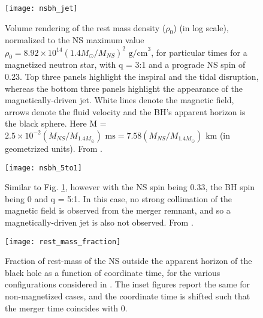     \begin{figure}[H]
        \centering
        \texttt{[image: nsbh\_jet]}
        \caption[Tidal disruption of a NS in a 3:1 NSBH binary]{
                    Volume rendering of the rest mass density ($\rho_0$) (in log scale),
                    normalized to the NS maximum value $\rho_0 = 8.92 \times 10^{14}
                    (1.4 M_{\odot}/M_{NS})^2 \text{ g/cm}^3$, for particular times for a
                    magnetized neutron star, with q = 3:1 and a prograde NS spin of
                    0.23.  Top three panels highlight the inspiral and the tidal
                    disruption, whereas the bottom three panels highlight the appearance
                    of the magnetically-driven jet. White lines denote the magnetic
                    field, arrows denote the fluid velocity and the BH's apparent
                    horizon is the black sphere. Here M = $2.5 \times 10^{-2}
                    (M_{NS}/M_{1.4M_{\odot}}) \text{ ms} = 7.58
                    (M_{NS}/M_{1.4M_{\odot}}) \text{ km}$ (in geometrized units). From
                    \cite{ruiz_2020}.
             }
        \label{fig:nsbh_jet}
    \end{figure}

    \begin{figure}[H]
        \centering
        \texttt{[image: nsbh\_5to1]}
        \caption[Tidal disruption of a NS in a 5:1 NSBH binary]{
                    Similar to Fig. \ref{fig:nsbh_jet}, however with the NS spin being
                    0.33, the BH spin being 0 and q = 5:1. In this case, no strong
                    collimation of the magnetic field is observed from the merger
                    remnant, and so a magnetically-driven jet is also not observed.
                    From \cite{ruiz_2020}.
            }
        \label{fig:nsbh_5to1}
    \end{figure}

    \begin{figure}[H]
        \centering
        \texttt{[image: rest\_mass\_fraction]}
        \caption[Rest mass outside black hole horizon, as a function of time]{
                    Fraction of rest-mass of the NS outside the apparent horizon of the
                    black hole as a function of coordinate time, for the various
                    configurations considered in \cite{ruiz_2020}. The inset figures
                    report the same for non-magnetized cases, and the coordinate time is
                    shifted such that the merger time coincides with 0.
            }
        \label{fig:rest_mass_fraction}
    \end{figure}

